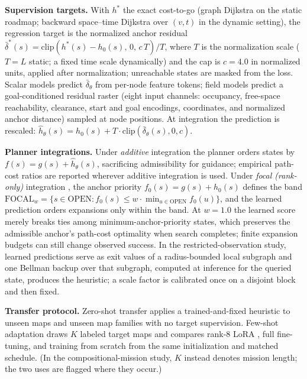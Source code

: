 \documentclass[letterpaper]{article} %
\begin{document}
\textbf{Supervision targets.} With $h^{*}$ the exact cost-to-go (graph Dijkstra on the static roadmap; backward space--time Dijkstra over $(v,t)$ in the dynamic setting), the regression target is the normalized anchor residual $\bar\delta^{*}(s) = \mathrm{clip}\!\left(h^{*}(s) - h_0(s),\, 0,\, c\,T\right)/T$, where $T$ is the normalization scale ($T{=}L$ static; a fixed time scale dynamically) and the cap is $c{=}4.0$ in normalized units, applied after normalization; unreachable states are masked from the loss. Scalar models predict $\bar\delta_\theta$ from per-node feature tokens; field models predict a goal-conditioned residual raster (eight input channels: occupancy, free-space reachability, clearance, start and goal encodings, coordinates, and normalized anchor distance) sampled at node positions. At integration the prediction is rescaled: $\hat h_\theta(s) = h_0(s) + T \cdot \mathrm{clip}(\bar\delta_\theta(s), 0, c)$.

\textbf{Planner integrations.} Under \emph{additive} integration the planner orders states by $f(s) = g(s) + \hat h_\theta(s)$, sacrificing admissibility for guidance; empirical path-cost ratios are reported wherever additive integration is used. Under \emph{focal (rank-only)} integration \citep{pohl1970,pearl1982semiadmissible}, the anchor priority $f_0(s) = g(s) + h_0(s)$ defines the band $\mathrm{FOCAL}_w = \{ s \in \mathrm{OPEN} : f_0(s) \leq w \cdot \min_{u \in \mathrm{OPEN}} f_0(u) \}$, and the learned prediction orders expansions only within the band. At $w{=}1.0$ the learned score merely breaks ties among minimum-anchor-priority states, which preserves the admissible anchor's path-cost optimality when search completes; finite expansion budgets can still change observed success. In the restricted-observation study, learned predictions serve as exit values of a radius-bounded local subgraph and one Bellman backup over that subgraph, computed at inference for the queried state, produces the heuristic; a scale factor is calibrated once on a disjoint block and then fixed.

\textbf{Transfer protocol.} Zero-shot transfer applies a trained-and-fixed heuristic to unseen maps and unseen map families with no target supervision. Few-shot adaptation draws $K$ labeled target maps and compares rank-8 LoRA \citep{hu2021lora}, full fine-tuning, and training from scratch from the same initialization and matched schedule. (In the compositional-mission study, $K$ instead denotes mission length; the two uses are flagged where they occur.)
\end{document}
